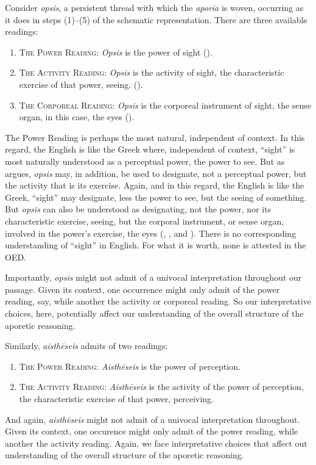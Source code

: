 Consider \emph{opsis}, a persistent thread with which the \emph{aporia} is woven, occurring as it does in steps (1)–(5) of the schematic representation. There are three available readings:
\begin{enumerate}[(1)]
	\item \textsc{The Power Reading}: \emph{Opsis} is the power of sight (\citealt{Johansen:2005hz}).
	\item \textsc{The Activity Reading}: \emph{Opsis} is the activity of sight, the characteristic exercise of that power, seeing. (\citealt{caston02}).
	\item \textsc{The Corporeal Reading}: \emph{Opsis} is the corporeal instrument of sight, the sense organ, in this case, the eyes (\citealt{Trubowitz:2025aa}).
\end{enumerate}
The Power Reading is perhaps the most natural, independent of context. In this regard, the English is like the Greek where, independent of context, ``sight'' is most naturally understood as a perceptual power, the power to see. But as \citet{caston02} argues, \emph{opsis} may, in addition, be used to designate, not a perceptual power, but the activity that is its exercise. Again, and in this regard, the English is like the Greek, ``sight'' may designate, less the power to see, but the seeing of something. But \emph{opsis} can also be understood as designating, not the power, nor its characteristic exercise, seeing, but the corporal instrument, or sense organ, involved in the power's exercise, the eyes (\citealt[]{Bonitz:1870aa}, \citealt[]{Hicks:1907uq}, and \citealt{Trubowitz:2025aa}). There is no corresponding understanding of ``sight'' in English. For what it is worth, none is attested in the OED.

Importantly, \emph{opsis} might not admit of a univocal interpretation throughout our passage. Given its context, one occurrence might only admit of the power reading, say, while another the activity or corporeal reading. So our interpretative choices, here, potentially affect our understanding of the overall structure of the aporetic reasoning.

Similarly, \emph{aisthēseis} admits of two readings:
\begin{enumerate}[(1)]
	\item \textsc{The Power Reading}: \emph{Aisthēseis} is the power of perception.
	\item \textsc{The Activity Reading}: \emph{Aisthēseis} is the activity of the power of perception, the characteristic exercise of that power, perceiving.
\end{enumerate}
And again, \emph{aisthēseis} might not admit of a univocal interpretation throughout. Given its context, one occurence might only admit of the power reading, while another the activity reading. Again, we face interpretative choices that affect out understanding of the overall structure of the aporetic reasoning. 

